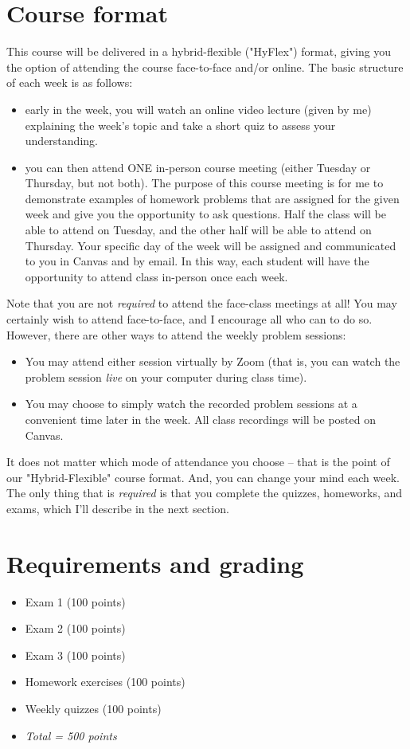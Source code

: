 \documentclass[10pt]{article}
\begin{document}
\section*{Course format}
\label{sec:org9bf886b}

This course will be delivered in a hybrid-flexible ("HyFlex") format, giving you the option of attending the course face-to-face and/or online. The basic structure of each week is as follows:

\begin{itemize}
\item early in the week, you will watch an online video lecture (given by me) explaining the week's topic and take a short quiz to assess your understanding.

\item you can then attend ONE in-person course meeting (either Tuesday or Thursday, but not both). The purpose of this course meeting is for me to demonstrate examples of homework problems that are assigned for the given week and give you the opportunity to ask questions. Half the class will be able to attend on Tuesday, and the other half will be able to attend on Thursday. Your specific day of the week will be assigned and communicated to you in Canvas and by email. In this way, each student will have the opportunity to attend class in-person once each week.
\end{itemize}

Note that you are not \emph{required} to attend the face-class meetings at all! You may certainly wish to attend face-to-face, and I encourage all who can to do so. However, there are other ways to attend the weekly problem sessions:
\begin{itemize}
\item You may attend either session virtually by Zoom (that is, you can watch the problem session \emph{live} on your computer during class time).
\item You may choose to simply watch the recorded problem sessions at a convenient time later in the week. All class recordings will be posted on Canvas.
\end{itemize}

It does not matter which mode of attendance you choose -- that is the point of our "Hybrid-Flexible" course format. And, you can change your mind each week. The only thing that is \emph{required} is that you complete the quizzes, homeworks, and exams, which I'll describe in the next section.

\section*{Requirements and grading}
\label{sec:org7711112}
\begin{itemize}
\item Exam 1 (100 points)
\item Exam 2 (100 points)
\item Exam 3 (100 points)
\item Homework exercises (100 points)
\item Weekly quizzes (100 points)
\item \emph{Total = 500 points}
\end{itemize}
\end{document}
